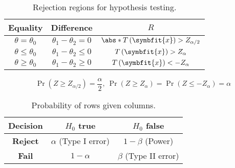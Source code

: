 \documentclass{article}
\begin{document}
\begin{multicols}{2}
    \begin{table}[H]
        \centering
        \begin{tabular}{ccc}
            \toprule
            \textbf{Equality}        & \textbf{Difference}            & \(R\)                                                 \\
            \midrule
            \(\theta = \theta_0\)    & \(\theta_1 - \theta_2 = 0\)    & \(\abs*{T\left( \symbfit{x} \right)} > Z_{\alpha/2}\) \\
            \(\theta \leq \theta_0\) & \(\theta_1 - \theta_2 \leq 0\) & \(T\left( \symbfit{x} \right) > Z_{\alpha}\)          \\
            \(\theta \geq \theta_0\) & \(\theta_1 - \theta_2 \geq 0\) & \(T\left( \symbfit{x} \right) < -Z_{\alpha}\)         \\
            \bottomrule
        \end{tabular}
        \caption{Rejection regions for hypothesis testing.}
        \begin{equation*}
            \Pr{\left( Z \geq Z_{\alpha / 2} \right)} = \frac{\alpha}{2},\: \Pr{\left( Z \geq Z_{\alpha} \right)} = \Pr{\left( Z \leq -Z_{\alpha} \right)} = \alpha
        \end{equation*}
    \end{table}
    \begin{table}[H]
        \centering
        \begin{tabular}{c|cc}
            \toprule
            \textbf{Decision} & \textbf{\(H_0\) true}     & \textbf{\(H_0\) false}    \\
            \midrule
            \textbf{Reject}   & \(\alpha\) (Type I error) & \(1 - \beta\) (Power)     \\
            \textbf{Fail}     & \(1 - \alpha\)            & \(\beta\) (Type II error) \\
            \bottomrule
        \end{tabular}
        \caption{Probability of rows given columns.}
    \end{table}

\end{multicols}
\end{document}
